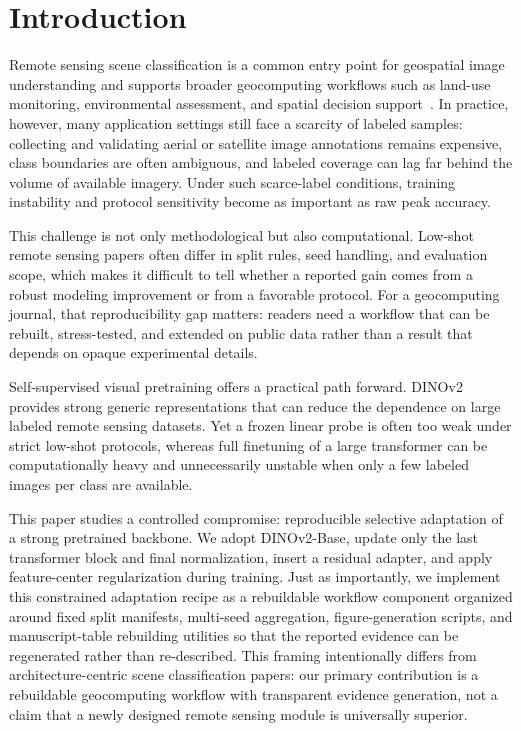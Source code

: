 \section{Introduction}

Remote sensing scene classification is a common entry point for geospatial image understanding and supports broader geocomputing workflows such as land-use monitoring, environmental assessment, and spatial decision support~\cite{cheng2017survey,thapa2023review}. In practice, however, many application settings still face a scarcity of labeled samples: collecting and validating aerial or satellite image annotations remains expensive, class boundaries are often ambiguous, and labeled coverage can lag far behind the volume of available imagery. Under such scarce-label conditions, training instability and protocol sensitivity become as important as raw peak accuracy.

This challenge is not only methodological but also computational. Low-shot remote sensing papers often differ in split rules, seed handling, and evaluation scope, which makes it difficult to tell whether a reported gain comes from a robust modeling improvement or from a favorable protocol. For a geocomputing journal, that reproducibility gap matters: readers need a workflow that can be rebuilt, stress-tested, and extended on public data rather than a result that depends on opaque experimental details.

Self-supervised visual pretraining offers a practical path forward. DINOv2~\cite{oquab2023dinov2} provides strong generic representations that can reduce the dependence on large labeled remote sensing datasets. Yet a frozen linear probe is often too weak under strict low-shot protocols, whereas full finetuning of a large transformer can be computationally heavy and unnecessarily unstable when only a few labeled images per class are available.

This paper studies a controlled compromise: reproducible selective adaptation of a strong pretrained backbone. We adopt DINOv2-Base, update only the last transformer block and final normalization, insert a residual adapter, and apply feature-center regularization during training. Just as importantly, we implement this constrained adaptation recipe as a rebuildable workflow component organized around fixed split manifests, multi-seed aggregation, figure-generation scripts, and manuscript-table rebuilding utilities so that the reported evidence can be regenerated rather than re-described. This framing intentionally differs from architecture-centric scene classification papers: our primary contribution is a rebuildable geocomputing workflow with transparent evidence generation, not a claim that a newly designed remote sensing module is universally superior.

